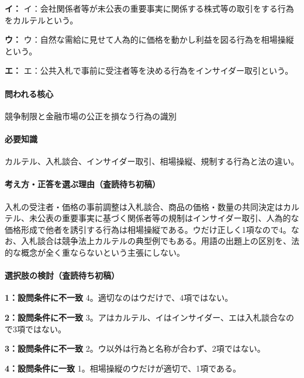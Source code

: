 \noindent\textbf{イ：} イ：会社関係者等が未公表の重要事実に関係する株式等の取引をする行為をカルテルという。\par

\noindent\textbf{ウ：} ウ：自然な需給に見せて人為的に価格を動かし利益を図る行為を相場操縦という。\par

\noindent\textbf{エ：} エ：公共入札で事前に受注者等を決める行為をインサイダー取引という。\par

\paragraph{問われる核心} 競争制限と金融市場の公正を損なう行為の識別

\paragraph{必要知識} カルテル、入札談合、インサイダー取引、相場操縦、規制する行為と法の違い。

\paragraph{考え方・正答を選ぶ理由（査読待ち初稿）} 入札の受注者・価格の事前調整は入札談合、商品の価格・数量の共同決定はカルテル、未公表の重要事実に基づく関係者等の規制はインサイダー取引、人為的な価格形成で他者を誘引する行為は相場操縦である。ウだけ正しく1項なので4。なお、入札談合は競争法上カルテルの典型例でもある。用語の出題上の区別を、法的な概念が全く重ならないという主張にしない。

\paragraph{選択肢の検討（査読待ち初稿）}\mbox{}\par

\noindent\textbf{1：設問条件に不一致} 4。適切なのはウだけで、4項ではない。\par

\noindent\textbf{2：設問条件に不一致} 3。アはカルテル、イはインサイダー、エは入札談合なので3項ではない。\par

\noindent\textbf{3：設問条件に不一致} 2。ウ以外は行為と名称が合わず、2項ではない。\par

\noindent\textbf{4：設問条件に一致} 1。相場操縦のウだけが適切で、1項である。\par

